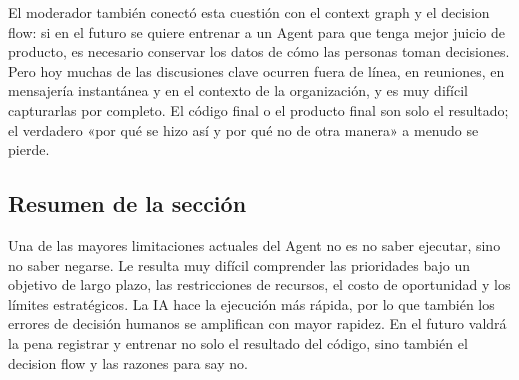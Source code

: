El moderador también conectó esta cuestión con el context graph y el decision flow: si en el futuro se quiere entrenar a un Agent para que tenga mejor juicio de producto, es necesario conservar los datos de cómo las personas toman decisiones. Pero hoy muchas de las discusiones clave ocurren fuera de línea, en reuniones, en mensajería instantánea y en el contexto de la organización, y es muy difícil capturarlas por completo. El código final o el producto final son solo el resultado; el verdadero «por qué se hizo así y por qué no de otra manera» a menudo se pierde.

\subsection{Resumen de la sección}

Una de las mayores limitaciones actuales del Agent no es no saber ejecutar, sino no saber negarse. Le resulta muy difícil comprender las prioridades bajo un objetivo de largo plazo, las restricciones de recursos, el costo de oportunidad y los límites estratégicos. La IA hace la ejecución más rápida, por lo que también los errores de decisión humanos se amplifican con mayor rapidez. En el futuro valdrá la pena registrar y entrenar no solo el resultado del código, sino también el decision flow y las razones para say no.

